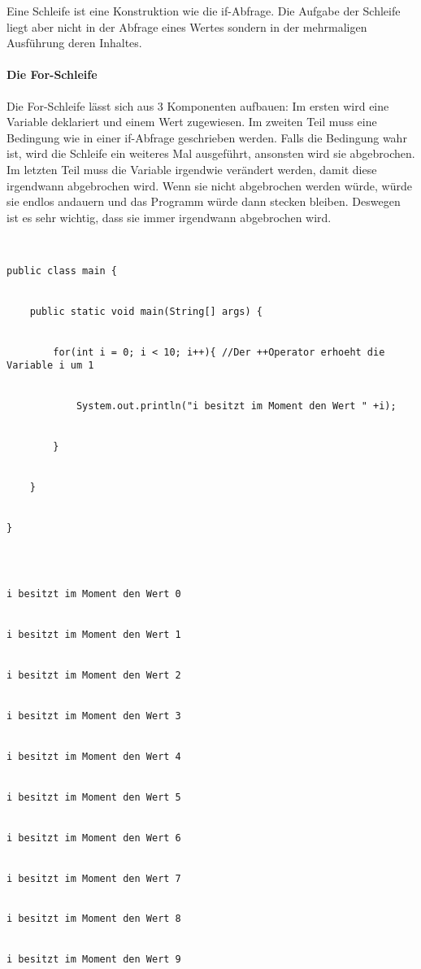 Eine Schleife ist eine Konstruktion wie die if-Abfrage. Die Aufgabe der Schleife liegt aber nicht in der Abfrage eines Wertes sondern in der mehrmaligen Ausführung deren Inhaltes.


\paragraph{Die For-Schleife}


Die For-Schleife lässt sich aus 3 Komponenten aufbauen: Im ersten wird eine Variable deklariert und einem Wert zugewiesen. Im zweiten Teil muss eine Bedingung wie in einer if-Abfrage geschrieben werden. Falls die Bedingung wahr ist, wird die Schleife ein weiteres Mal ausgeführt, ansonsten wird sie abgebrochen. Im letzten Teil muss die Variable irgendwie verändert werden, damit diese irgendwann abgebrochen wird. Wenn sie nicht abgebrochen werden würde, würde sie endlos andauern und das Programm würde dann stecken bleiben. Deswegen ist es sehr wichtig, dass sie immer irgendwann abgebrochen wird.


\begin{lstlisting}


public class main {


	public static void main(String[] args) {


		for(int i = 0; i < 10; i++){ //Der ++Operator erhoeht die Variable i um 1


			System.out.println("i besitzt im Moment den Wert " +i);


		}


	}


}


\end{lstlisting}


\begin{lstlisting}[style=console]


i besitzt im Moment den Wert 0


i besitzt im Moment den Wert 1


i besitzt im Moment den Wert 2


i besitzt im Moment den Wert 3


i besitzt im Moment den Wert 4


i besitzt im Moment den Wert 5


i besitzt im Moment den Wert 6


i besitzt im Moment den Wert 7


i besitzt im Moment den Wert 8


i besitzt im Moment den Wert 9


\end{lstlisting}


